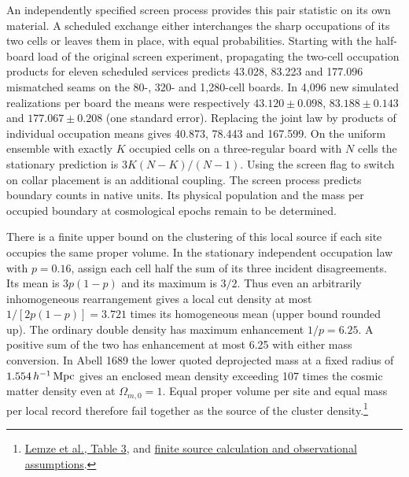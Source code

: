 \documentclass[11pt]{article}
\begin{document}
An independently specified screen process provides this pair statistic
on its own material. A scheduled exchange either interchanges the sharp
occupations of its two cells or leaves them in place, with equal
probabilities. Starting with the half-board load of the original screen
experiment, propagating the two-cell occupation products for eleven
scheduled services predicts 43.028, 83.223 and 177.096 mismatched seams
on the 80-, 320- and 1,280-cell boards. In 4,096 new simulated realizations
per board the means were respectively $43.120\pm0.098$, $83.188\pm0.143$
and $177.067\pm0.208$ (one standard error). Replacing the joint law by
products of individual occupation means gives 40.873, 78.443 and 167.599.
On the uniform ensemble with exactly $K$ occupied cells on a three-regular
board with $N$ cells the stationary prediction is $3K(N-K)/(N-1)$.
Using the screen flag to switch on collar placement is an additional
coupling. The screen process predicts boundary counts in native units.
Its physical population and the mass per occupied boundary at cosmological
epochs remain to be determined.

There is a finite upper bound on the clustering of this local
source if each site occupies the same proper volume. In the stationary
independent occupation law with $p=0.16$, assign each cell half the sum
of its three incident disagreements. Its mean is $3p(1-p)$ and its
maximum is $3/2$. Thus even an arbitrarily inhomogeneous rearrangement
gives a local cut density at most $1/[2p(1-p)]=3.721$ times its
homogeneous mean (upper bound rounded up). The ordinary double density
has maximum enhancement $1/p=6.25$. A positive sum of the two has
enhancement at most 6.25 with either mass conversion. In Abell 1689
the lower quoted deprojected mass at a fixed radius of
$1.554\,h^{-1}\,{\rm Mpc}$ gives an enclosed mean density exceeding
107 times the cosmic matter density even at $\Omega_{m,0}=1$. Equal proper volume per site and equal mass per
local record therefore fail together as the source of the cluster
density.\footnote{\href{https://doi.org/10.1111/j.1365-2966.2008.13116.x}{Lemze et al., Table 3},
and \href{https://github.com/FloatingPragma/observer-patch-holography/tree/main/code/cosmology/record_abundance}{finite source calculation and observational assumptions}.}
\end{document}
